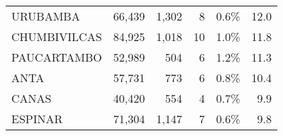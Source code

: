 \begin{tabular}{lrrrrr}
	\cellcolor[HTML]{9AFF99}URUBAMBA      & 66,439                                                         & 1,302                                                                            & 8                                                                & 0.6\%                                                                  & 12.0                                                                                                                              \\
	\cellcolor[HTML]{9AFF99}CHUMBIVILCAS  & 84,925                                                         & 1,018                                                                            & 10                                                               & 1.0\%                                                                  & 11.8                                                                                                                              \\
	\cellcolor[HTML]{9AFF99}PAUCARTAMBO   & 52,989                                                         & 504                                                                              & 6                                                                & 1.2\%                                                                  & 11.3                                                                                                                              \\
	\cellcolor[HTML]{9AFF99}ANTA          & 57,731                                                         & 773                                                                              & 6                                                                & 0.8\%                                                                  & 10.4                                                                                                                              \\
	\cellcolor[HTML]{9AFF99}CANAS         & 40,420                                                         & 554                                                                              & 4                                                                & 0.7\%                                                                  & 9.9                                                                                                                               \\
	\cellcolor[HTML]{9AFF99}ESPINAR       & 71,304                                                         & 1,147                                                                            & 7                                                                & 0.6\%                                                                  & 9.8                                                                                                                               \\

\end{tabular}
